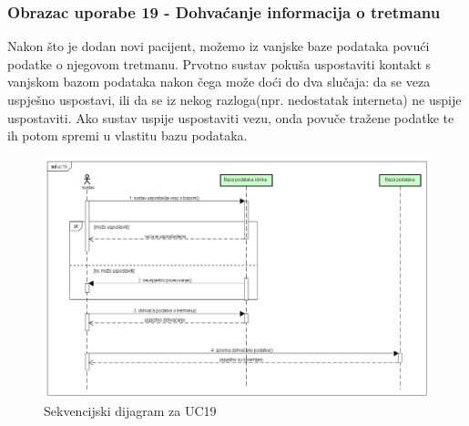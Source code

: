 			\subsubsection{Obrazac uporabe 19 - Dohvaćanje informacija o tretmanu}
			Nakon što je dodan novi pacijent, možemo iz vanjske baze podataka povući podatke o njegovom tretmanu. Prvotno sustav pokuša uspostaviti kontakt s vanjskom bazom podataka nakon čega može doći do dva slučaja: da se veza uspješno uspostavi, ili da se iz nekog razloga(npr. nedostatak interneta) ne uspije uspostaviti. Ako sustav uspije uspostaviti vezu, onda povuče tražene podatke te ih potom spremi u vlastitu bazu podataka.
			\begin{figure}[H]
				\centering
				\includegraphics[width=\textwidth]{slike/uc19(update).png} %
				\caption{Sekvencijski dijagram za UC19}
				\label{fig:Sekvencijski dijagram za UC19}
			\end{figure}
			\eject		
			
